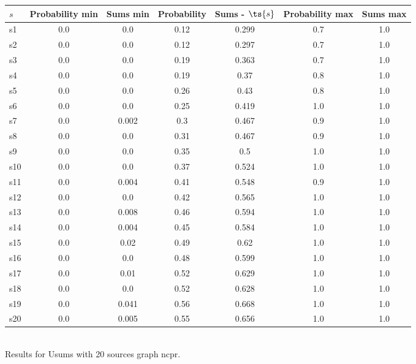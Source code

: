 \documentclass{article}
\begin{document}
\noindent\begin{tabular}{|l|c|c|c|c|c|c|}
\hline
$s$& Probability min & Sums min & Probability & Sums - $\ts{s}$ & Probability max & Sums max\\
\hline
s1 &0.0 & 0.0 & 0.12 & 0.299 & 0.7 & 1.0\\
\hline
s2 &0.0 & 0.0 & 0.12 & 0.297 & 0.7 & 1.0\\
\hline
s3 &0.0 & 0.0 & 0.19 & 0.363 & 0.7 & 1.0\\
\hline
s4 &0.0 & 0.0 & 0.19 & 0.37 & 0.8 & 1.0\\
\hline
s5 &0.0 & 0.0 & 0.26 & 0.43 & 0.8 & 1.0\\
\hline
s6 &0.0 & 0.0 & 0.25 & 0.419 & 1.0 & 1.0\\
\hline
s7 &0.0 & 0.002 & 0.3 & 0.467 & 0.9 & 1.0\\
\hline
s8 &0.0 & 0.0 & 0.31 & 0.467 & 0.9 & 1.0\\
\hline
s9 &0.0 & 0.0 & 0.35 & 0.5 & 1.0 & 1.0\\
\hline
s10 &0.0 & 0.0 & 0.37 & 0.524 & 1.0 & 1.0\\
\hline
s11 &0.0 & 0.004 & 0.41 & 0.548 & 0.9 & 1.0\\
\hline
s12 &0.0 & 0.0 & 0.42 & 0.565 & 1.0 & 1.0\\
\hline
s13 &0.0 & 0.008 & 0.46 & 0.594 & 1.0 & 1.0\\
\hline
s14 &0.0 & 0.004 & 0.45 & 0.584 & 1.0 & 1.0\\
\hline
s15 &0.0 & 0.02 & 0.49 & 0.62 & 1.0 & 1.0\\
\hline
s16 &0.0 & 0.0 & 0.48 & 0.599 & 1.0 & 1.0\\
\hline
s17 &0.0 & 0.01 & 0.52 & 0.629 & 1.0 & 1.0\\
\hline
s18 &0.0 & 0.0 & 0.52 & 0.628 & 1.0 & 1.0\\
\hline
s19 &0.0 & 0.041 & 0.56 & 0.668 & 1.0 & 1.0\\
\hline
s20 &0.0 & 0.005 & 0.55 & 0.656 & 1.0 & 1.0\\
\hline
\end{tabular}\\

\noindent Results for Usums with 20 sources graph ncpr.
\end{document}
